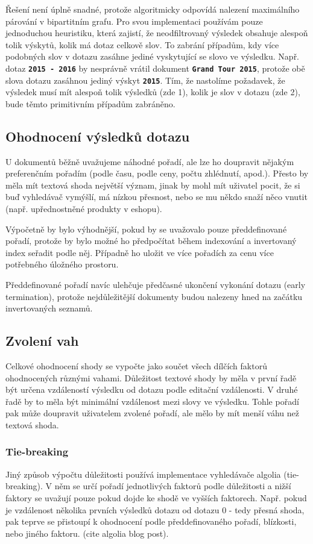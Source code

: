 \documentclass[11pt,letterpaper,oneside,openright]{book}
\newcommand{\bftt}[1]{\texttt{\textbf{#1}}}
\begin{document}
Řešení není úplně snadné, protože algoritmicky odpovídá nalezení maximálního
párování v bipartitním grafu. Pro svou implementaci používám pouze jednoduchou
heuristiku, která zajistí, že neodfiltrovaný výsledek obsahuje alespoň tolik
výskytů, kolik má dotaz celkově slov. To zabrání případům, kdy více podobných
slov v dotazu zasáhne jediné vyskytující se slovo ve výsledku. Např. dotaz
\bftt{2015 - 2016} by nesprávně vrátil dokument \bftt{Grand Tour 2015}, protože
obě slova dotazu zasáhnou jediný výskyt \bftt{2015}. Tím, že nastolíme
požadavek, že výsledek musí mít alespoň tolik výsledků (zde 1), kolik je slov v
dotazu (zde 2), bude těmto primitivním případům zabráněno.


\subsection{Ohodnocení výsledků dotazu}
U dokumentů běžně uvažujeme náhodné pořadí, ale lze ho doupravit nějakým
preferenčním pořadím (podle času, podle ceny, počtu zhlédnutí, apod.). Přesto
by měla mít textová shoda největší význam, jinak by mohl mít uživatel pocit, že
si buď vyhledávač vymýšlí, má nízkou přesnost, nebo se mu někdo snaží něco
vnutit (např. upřednostněné produkty v eshopu).

Výpočetně by bylo výhodnější, pokud by se uvažovalo pouze předdefinované
pořadí, protože by bylo možné ho předpočítat během indexování a invertovaný
index seřadit podle něj. Případně ho uložit ve více pořadích za cenu více
potřebného úložného prostoru.

Předdefinované pořadí navíc ulehčuje předčasné ukončení vykonání dotazu (early
termination), protože nejdůležitější dokumenty budou nalezeny hned na začátku
invertovaných seznamů.

\subsection{Zvolení vah}
Celkové ohodnocení shody se vypočte jako součet všech dílčích faktorů
ohodnocených různými vahami. Důležitost textové shody by měla v první řadě být
určena vzdáleností výsledku od dotazu podle editační vzdálenosti. V druhé řadě
by to měla být minimální vzdálenost mezi slovy ve výsledku.  Tohle pořadí pak
může doupravit uživatelem zvolené pořadí, ale mělo by mít menší váhu než
textová shoda.

\subsubsection{Tie-breaking}
Jiný způsob výpočtu důležitosti používá implementace vyhledávače algolia
(tie-breaking). V něm se určí pořadí jednotlivých faktorů podle
důležitosti a nižší faktory se uvažují pouze pokud dojde ke shodě ve
vyšších faktorech. Např.  pokud je vzdálenost několika prvních výsledků
dotazu od dotazu 0 - tedy přesná shoda, pak teprve se přistoupí k
ohodnocení podle předdefinovaného pořadí, blízkosti, nebo jiného
faktoru. (cite algolia blog post).
\end{document}
